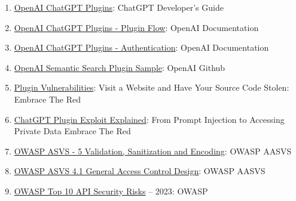 \documentclass[
]{article}
\providecommand{\tightlist}{%
  \setlength{\itemsep}{0pt}\setlength{\parskip}{0pt}}
\begin{document}
\begin{enumerate}
\def\labelenumi{\arabic{enumi}.}
\tightlist
\item
  \href{https://platform.openai.com/docs/plugins/introduction}{OpenAI
  ChatGPT Plugins}: ChatGPT Developer's Guide
\item
  \href{https://platform.openai.com/docs/plugins/introduction}{OpenAI
  ChatGPT Plugins - Plugin Flow}: OpenAI Documentation
\item
  \href{https://platform.openai.com/docs/plugins/authentication}{OpenAI
  ChatGPT Plugins - Authentication}: OpenAI Documentation
\item
  \href{https://github.com/openai/chatgpt-retrieval-plugin}{OpenAI
  Semantic Search Plugin Sample}: OpenAI Github
\item
  \href{https://embracethered.com/blog/posts/2023/chatgpt-plugin-vulns-chat-with-code/}{Plugin
  Vulnerabilities}: Visit a Website and Have Your Source Code Stolen:
  Embrace The Red
\item
  \href{https://embracethered.com/blog/posts/2023/chatgpt-cross-plugin-request-forgery-and-prompt-injection./}{ChatGPT
  Plugin Exploit Explained}: From Prompt Injection to Accessing Private
  Data Embrace The Red
\item
  \href{https://owasp-aasvs4.readthedocs.io/en/latest/V5.html\#validation-sanitization-and-encoding}{OWASP
  ASVS - 5 Validation, Sanitization and Encoding}: OWASP AASVS
\item
  \href{https://owasp-aasvs4.readthedocs.io/en/latest/V4.1.html\#general-access-control-design}{OWASP
  ASVS 4.1 General Access Control Design}: OWASP AASVS
\item
  \href{https://owasp.org/API-Security/editions/2023/en/0x11-t10/}{OWASP
  Top 10 API Security Risks} -- 2023: OWASP
\end{enumerate}
\end{document}

